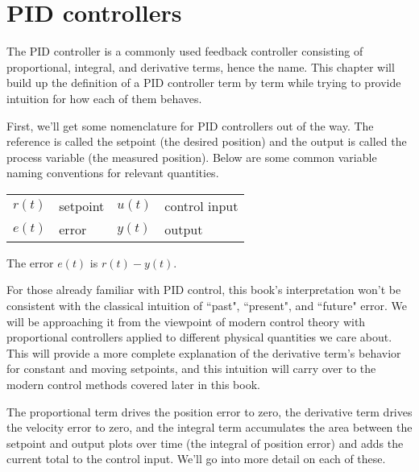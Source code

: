 
\chapter{PID controllers}

The PID controller is a commonly used feedback controller consisting of
proportional, integral, and derivative terms, hence the name. This chapter will
build up the definition of a PID controller term by term while trying to provide
intuition for how each of them behaves.

First, we'll get some nomenclature for PID controllers out of the way. The
\gls{reference} is called the \gls{setpoint} (the desired position) and the
\gls{output} is called the \gls{process variable} (the measured position). Below
are some common variable naming conventions for relevant quantities.
\begin{figurekey}
  \begin{tabular}{llll}
    $r(t)$ & \gls{setpoint} & $u(t)$ & \gls{control input} \\
    $e(t)$ & \gls{error} & $y(t)$ & \gls{output}
  \end{tabular}
\end{figurekey}

The \gls{error} $e(t)$ is $r(t) - y(t)$.

For those already familiar with PID control, this book's interpretation won't be
consistent with the classical intuition of ``past", ``present", and ``future"
error. We will be approaching it from the viewpoint of modern control theory
with proportional controllers applied to different physical quantities we care
about. This will provide a more complete explanation of the derivative term's
behavior for constant and moving \glspl{setpoint}, and this intuition will carry
over to the modern control methods covered later in this book.

The proportional term drives the position error to zero, the derivative term
drives the velocity error to zero, and the integral term accumulates the area
between the \gls{setpoint} and \gls{output} plots over time (the integral of
position \gls{error}) and adds the current total to the \gls{control input}.
We'll go into more detail on each of these.

\renewcommand*{\chapterpath}{\partpath/pid-controllers}








